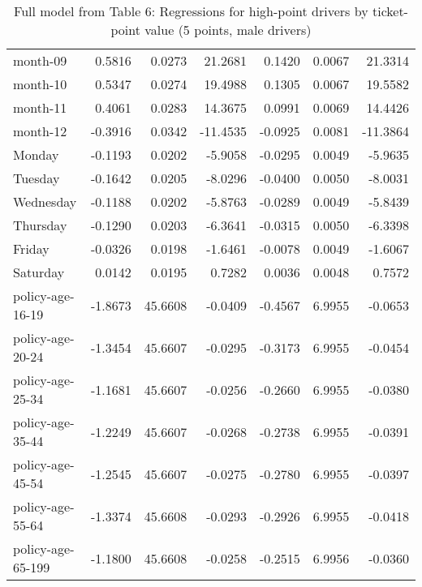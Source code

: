\documentclass[10pt]{article}
\begin{document}
\begin{table}[ht]
\begin{tabular}{lrrrrrr}
  month-09 & 0.5816 & 0.0273 & 21.2681 & 0.1420 & 0.0067 & 21.3314 \\ 
  month-10 & 0.5347 & 0.0274 & 19.4988 & 0.1305 & 0.0067 & 19.5582 \\ 
  month-11 & 0.4061 & 0.0283 & 14.3675 & 0.0991 & 0.0069 & 14.4426 \\ 
  month-12 & -0.3916 & 0.0342 & -11.4535 & -0.0925 & 0.0081 & -11.3864 \\ 
  Monday & -0.1193 & 0.0202 & -5.9058 & -0.0295 & 0.0049 & -5.9635 \\ 
  Tuesday & -0.1642 & 0.0205 & -8.0296 & -0.0400 & 0.0050 & -8.0031 \\ 
  Wednesday & -0.1188 & 0.0202 & -5.8763 & -0.0289 & 0.0049 & -5.8439 \\ 
  Thursday & -0.1290 & 0.0203 & -6.3641 & -0.0315 & 0.0050 & -6.3398 \\ 
  Friday & -0.0326 & 0.0198 & -1.6461 & -0.0078 & 0.0049 & -1.6067 \\ 
  Saturday & 0.0142 & 0.0195 & 0.7282 & 0.0036 & 0.0048 & 0.7572 \\ 
  policy-age-16-19 & -1.8673 & 45.6608 & -0.0409 & -0.4567 & 6.9955 & -0.0653 \\ 
  policy-age-20-24 & -1.3454 & 45.6607 & -0.0295 & -0.3173 & 6.9955 & -0.0454 \\ 
  policy-age-25-34 & -1.1681 & 45.6607 & -0.0256 & -0.2660 & 6.9955 & -0.0380 \\ 
  policy-age-35-44 & -1.2249 & 45.6607 & -0.0268 & -0.2738 & 6.9955 & -0.0391 \\ 
  policy-age-45-54 & -1.2545 & 45.6607 & -0.0275 & -0.2780 & 6.9955 & -0.0397 \\ 
  policy-age-55-64 & -1.3374 & 45.6608 & -0.0293 & -0.2926 & 6.9955 & -0.0418 \\ 
  policy-age-65-199 & -1.1800 & 45.6608 & -0.0258 & -0.2515 & 6.9956 & -0.0360 \\ 
   \hline
\end{tabular}
\caption{Full model from Table 6: Regressions for high-point drivers by ticket-point value (5 points, male drivers)} 
\label{tab_6_5_pts_M}
\end{table}


\clearpage
\pagebreak



\end{document}
